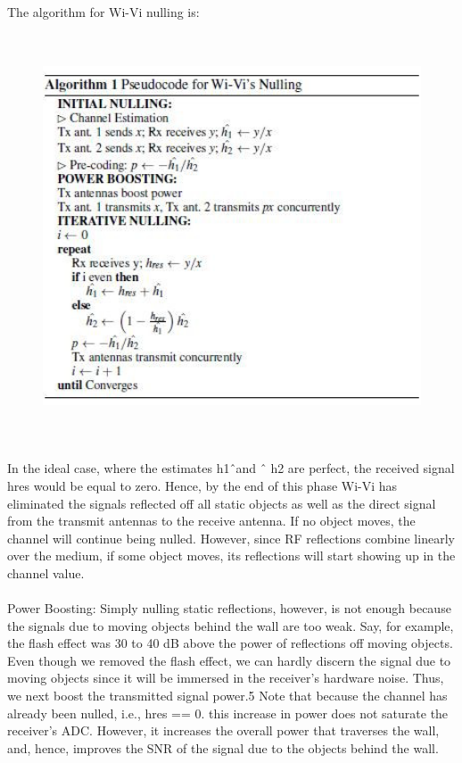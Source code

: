 \documentclass[a4paper,12pt,oneside]{article}
\begin{document}
The algorithm for Wi-Vi nulling is:
\begin{figure}[H]
\centering
\includegraphics[height=12cm,width=14cm]{9.png}
\end{figure}

\paragraph{}
In the ideal case, where the estimates h1ˆand ˆ h2 are perfect, the received signal hres
would be equal to zero. Hence, by the end of this phase Wi-Vi has eliminated the signals
reflected off all static objects as well as the direct signal from the transmit antennas to the receive
antenna. If no object moves, the channel will continue being nulled. However, since RF
reflections combine linearly over the medium, if some object moves, its reflections will start
showing up in the channel value.
\paragraph{}
Power Boosting: Simply nulling static reflections, however, is not enough because the signals
due to moving objects behind the wall are too weak. Say, for example, the flash effect was 30 to
40 dB above the power of reflections off moving objects. Even though we removed the flash
effect, we can hardly discern the signal due to moving objects since it will be immersed in the
receiver’s hardware noise. Thus, we next boost the transmitted signal power.5 Note that because
the channel has already been nulled, i.e., hres == 0. this increase in power does not saturate the
receiver’s ADC. However, it increases the overall power that traverses the wall, and, hence,
improves the SNR of the signal due to the objects behind the wall.
\end{document}
